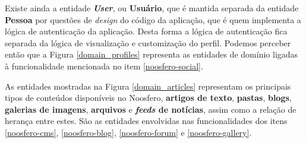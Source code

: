 Existe ainda a entidade \textbf{\textit{User}}, ou \textbf{Usuário}, que é
mantida separada da entidade \textbf{Pessoa} por questões de \textit{design}
do código da aplicação, que é quem implementa a lógica de autenticação da
aplicação. Desta forma a lógica de autenticação fica separada da lógica de
visualização e customização do perfil.
%
Podemos perceber então que a Figura \ref{domain_profiles} representa as
entidades de domínio ligadas à funcionalidade mencionada no item
\ref{noosfero-social}.

As entidades mostradas na Figura \ref{domain_articles} representam os
principais tipos de conteúdos disponíveis no Noosfero, \textbf{artigos
de texto}, \textbf{pastas}, \textbf{blogs}, \textbf{galerias de imagens},
\textbf{arquivos} e \textbf{\textit{feeds} de notícias}, assim como a
relação de herança entre estes. São as entidades envolvidas nas
funcionalidades dos itens \ref{noosfero-cms}, \ref{noosfero-blog},
\ref{noosfero-forum} e \ref{noosfero-gallery}.
